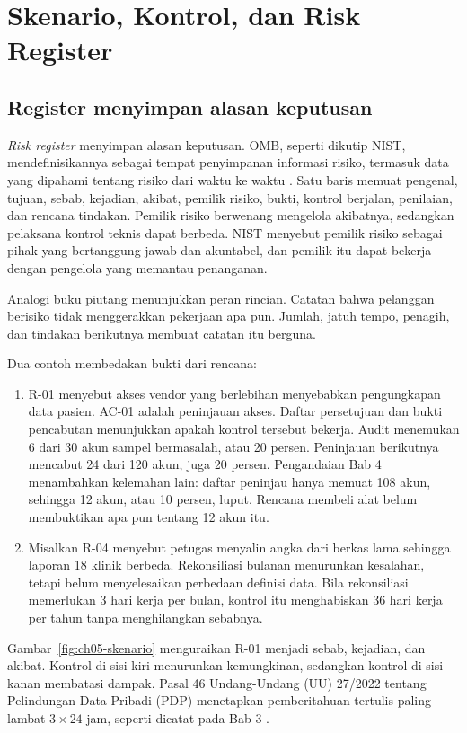 \section{Skenario, Kontrol, dan Risk Register}

\subsection*{Register menyimpan alasan keputusan}

\textit{Risk register} menyimpan alasan keputusan. OMB, seperti dikutip NIST, mendefinisikannya
sebagai tempat penyimpanan informasi risiko, termasuk data yang dipahami tentang risiko dari waktu ke
waktu \cite{c05-nist-ir8286r1}. Satu baris memuat pengenal, tujuan, sebab, kejadian, akibat, pemilik
risiko, bukti, kontrol berjalan, penilaian, dan rencana tindakan. Pemilik risiko berwenang mengelola
akibatnya, sedangkan pelaksana kontrol teknis dapat berbeda. NIST menyebut pemilik risiko sebagai
pihak yang bertanggung jawab dan akuntabel, dan pemilik itu dapat bekerja dengan pengelola yang
memantau penanganan.

Analogi buku piutang menunjukkan peran rincian. Catatan bahwa pelanggan berisiko tidak menggerakkan
pekerjaan apa pun. Jumlah, jatuh tempo, penagih, dan tindakan berikutnya membuat catatan itu berguna.

Dua contoh membedakan bukti dari rencana:
\begin{enumerate}
  \item R-01 menyebut akses vendor yang berlebihan menyebabkan pengungkapan data pasien. AC-01 adalah
  peninjauan akses. Daftar persetujuan dan bukti pencabutan menunjukkan apakah kontrol tersebut
  bekerja. Audit menemukan 6 dari 30 akun sampel bermasalah, atau 20 persen. Peninjauan berikutnya
  mencabut 24 dari 120 akun, juga 20 persen. Pengandaian Bab 4 menambahkan kelemahan lain: daftar
  peninjau hanya memuat 108 akun, sehingga 12 akun, atau 10 persen, luput. Rencana membeli alat
  belum membuktikan apa pun tentang 12 akun itu.
  \item Misalkan R-04 menyebut petugas menyalin angka dari berkas lama sehingga laporan 18 klinik
  berbeda. Rekonsiliasi bulanan menurunkan kesalahan, tetapi belum menyelesaikan perbedaan definisi
  data. Bila rekonsiliasi memerlukan 3 hari kerja per bulan, kontrol itu menghabiskan 36 hari kerja
  per tahun tanpa menghilangkan sebabnya.
\end{enumerate}

Gambar~\ref{fig:ch05-skenario} menguraikan R-01 menjadi sebab, kejadian, dan akibat. Kontrol di sisi
kiri menurunkan kemungkinan, sedangkan kontrol di sisi kanan membatasi dampak. Pasal 46 Undang-Undang
(UU) 27/2022 tentang Pelindungan Data Pribadi (PDP) menetapkan pemberitahuan tertulis paling lambat
$3 \times 24$ jam, seperti dicatat pada Bab 3 \cite{uu27-2022-pdp}.

